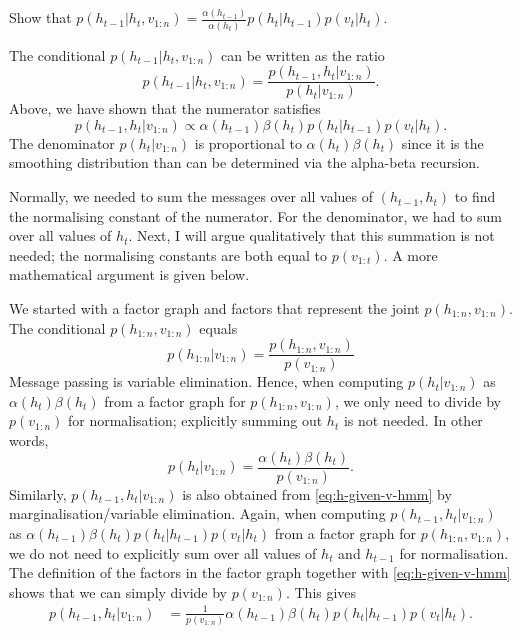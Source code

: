 \begin{exenumerate}
  \item Show that $p(h_{t-1}|h_t, v_{1:n}) = \frac{\alpha(h_{t-1})}{\alpha(h_t)} p(h_t|h_{t-1}) p(v_t|h_t)$.
   
    \begin{solution}
      The conditional $p(h_{t-1}|h_t, v_{1:n})$ can be written as the ratio
      \begin{equation}
        p(h_{t-1}|h_t, v_{1:n}) = \frac{p(h_{t-1}, h_t| v_{1:n})}{p(h_t|v_{1:n})}.
      \end{equation}
      Above, we have shown that the numerator satisfies
      \begin{equation}
        p(h_{t-1}, h_t| v_{1:n}) \propto \alpha(h_{t-1}) \beta(h_t) p(h_t|h_{t-1}) p(v_t|h_t).
      \end{equation}
      The denominator $p(h_t|v_{1:n})$ is proportional to $\alpha(h_t)
      \beta(h_t)$ since it is the smoothing distribution than can be
      determined via the alpha-beta recursion.

      Normally, we needed to sum the messages over all values of
      $(h_{t-1},h_t)$ to find the normalising constant of the
      numerator. For the denominator, we had to sum over all values of
      $h_t$. Next, I will argue qualitatively that this summation is
      not needed; the normalising constants are both equal to
      $p(v_{1:t})$. A more mathematical argument is given below.

      We started with a factor graph and factors that represent the
      joint $p(h_{1:n}, v_{1:n})$. The conditional $p(h_{1:n},
      v_{1:n})$ equals
      \begin{equation}
        \label{eq:h-given-v-hmm}
        p(h_{1:n} | v_{1:n}) = \frac{p(h_{1:n}, v_{1:n})}{p(v_{1:n})}
      \end{equation}
      Message passing is variable elimination. Hence, when computing
      $p(h_t|v_{1:n})$ as $\alpha(h_t) \beta(h_t)$ from a factor graph
      for $p(h_{1:n}, v_{1:n})$, we only need to divide by
      $p(v_{1:n})$ for normalisation; explicitly summing out $h_t$ is
      not needed. In other words,
      \begin{equation}
        p(h_t|v_{1:n}) =  \frac{\alpha(h_t) \beta(h_t)}{p(v_{1:n})}.
      \end{equation}
      Similarly, $p(h_{t-1}, h_t|v_{1:n})$ is also obtained from
      \eqref{eq:h-given-v-hmm} by marginalisation/variable
      elimination. Again, when computing $p(h_{t-1}, h_t|v_{1:n})$ as
      $\alpha(h_{t-1}) \beta(h_t) p(h_t|h_{t-1}) p(v_t|h_t)$ from a
      factor graph for $p(h_{1:n}, v_{1:n})$, we do not need to
      explicitly sum over all values of $h_t$ and $h_{t-1}$ for
      normalisation. The definition of the factors in the factor graph
      together with \eqref{eq:h-given-v-hmm} shows that we can simply
      divide by $p(v_{1:n})$. This gives
      \begin{align}
        p(h_{t-1}, h_t| v_{1:n}) & = \frac{1}{p(v_{1:n})} \alpha(h_{t-1}) \beta(h_t) p(h_t|h_{t-1}) p(v_t|h_t).
      \end{align}


\end{solution}
\end{exenumerate}
